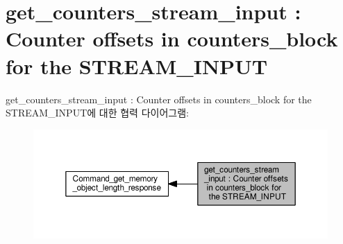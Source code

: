 \hypertarget{group__get__counters__stream__input}{}\section{get\+\_\+counters\+\_\+stream\+\_\+input \+: Counter offsets in counters\+\_\+block for the S\+T\+R\+E\+A\+M\+\_\+\+I\+N\+P\+UT}
\label{group__get__counters__stream__input}
get\+\_\+counters\+\_\+stream\+\_\+input \+: Counter offsets in counters\+\_\+block for the S\+T\+R\+E\+A\+M\+\_\+\+I\+N\+P\+U\+T에 대한 협력 다이어그램\+:
\nopagebreak
\begin{figure}[H]
\begin{center}
\leavevmode
\includegraphics[width=350pt]{group__get__counters__stream__input}
\end{center}
\end{figure}
